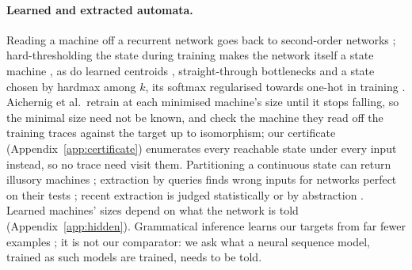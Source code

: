 \documentclass[11pt]{article}
\begin{document}
\paragraph{Learned and extracted automata.} Reading a machine off a recurrent network goes back to
second-order networks \citep{giles-1992-learning-extracting-fsa-second-order-rnn}; hard-thresholding
the state during training makes the network itself a state machine
\citep{zeng-1993-self-clustering-recurrent-networks}, as do learned centroids
\citep{wang-2019-state-regularized-rnns}, straight-through bottlenecks
\citep{koul-2019-finite-state-recurrent-policies} and a state chosen by hardmax among $k$, its
softmax regularised towards one-hot in training \citep{aichernig-2024-learning-minimal-automata-rnn}.
Aichernig et al.\ retrain at each minimised machine's size until it stops falling, so the minimal size
need not be known, and check the machine they read off the training traces against the target up to
isomorphism; our certificate (Appendix~\ref{app:certificate}) enumerates every reachable state under
every input instead, so no trace need visit them. Partitioning a continuous state can return
illusory machines \citep{kolen-1993-fools-gold-extracting-fsm}; extraction by queries finds wrong
inputs for networks perfect on their tests \citep{weiss-2018-extracting-automata-queries-counterexamples};
recent extraction is judged statistically or by abstraction
\citep{hong-2025-register-automata-data-sequences,wickramasinghe-2026-extracting-dfa-hyperplane-partitioning}.
Learned machines' sizes depend on what the network is told (Appendix~\ref{app:hidden}). Grammatical
inference learns our targets from far fewer examples
\citep{angluin-1987-learning-regular-sets-queries-counterexamples,oncina-1993-learning-subsequential-transducers};
it is not our comparator: we ask what a neural sequence model, trained as such models are trained,
needs to be told.
\end{document}
